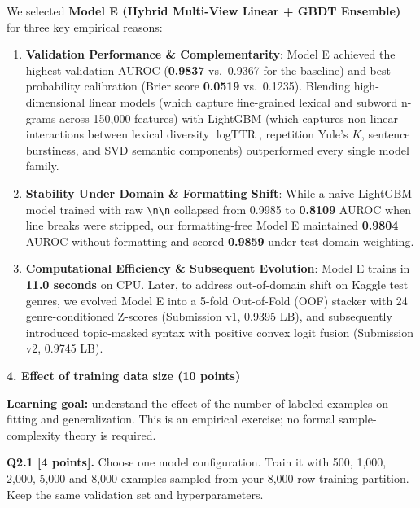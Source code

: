 \documentclass[11pt,letterpaper]{article}
\begin{document}
We selected \textbf{Model E (Hybrid Multi-View Linear + GBDT Ensemble)} for three key empirical reasons:
\begin{enumerate}[leftmargin=*,itemsep=1pt,topsep=2pt]
    \item \textbf{Validation Performance \& Complementarity}: Model E achieved the highest validation AUROC (\textbf{0.9837} vs.\ 0.9367 for the baseline) and best probability calibration (Brier score \textbf{0.0519} vs.\ 0.1235). Blending high-dimensional linear models (which capture fine-grained lexical and subword n-grams across 150,000 features) with LightGBM (which captures non-linear interactions between lexical diversity $\log\text{TTR}$, repetition Yule's $K$, sentence burstiness, and SVD semantic components) outperformed every single model family.
    \item \textbf{Stability Under Domain \& Formatting Shift}: While a naive LightGBM model trained with raw \texttt{\textbackslash n\textbackslash n} collapsed from 0.9985 to \textbf{0.8109} AUROC when line breaks were stripped, our formatting-free Model E maintained \textbf{0.9804} AUROC without formatting and scored \textbf{0.9859} under test-domain weighting.
    \item \textbf{Computational Efficiency \& Subsequent Evolution}: Model E trains in \textbf{11.0 seconds} on CPU. Later, to address out-of-domain shift on Kaggle test genres, we evolved Model E into a 5-fold Out-of-Fold (OOF) stacker with 24 genre-conditioned Z-scores (Submission v1, 0.9395 LB), and subsequently introduced topic-masked syntax with positive convex logit fusion (Submission v2, 0.9745 LB).
\end{enumerate}

\newpage

{\large\textbf{4. Effect of training data size (10 points)}}
\vspace{2pt}

\textbf{Learning goal:} understand the effect of the number of labeled examples on fitting and generalization. This is an empirical exercise; no formal sample-complexity theory is required.

\vspace{4pt}
\textbf{Q2.1 [4 points].} Choose one model configuration. Train it with 500, 1,000, 2,000, 5,000 and 8,000 examples sampled from your 8,000-row training partition. Keep the same validation set and hyperparameters.
\end{document}
